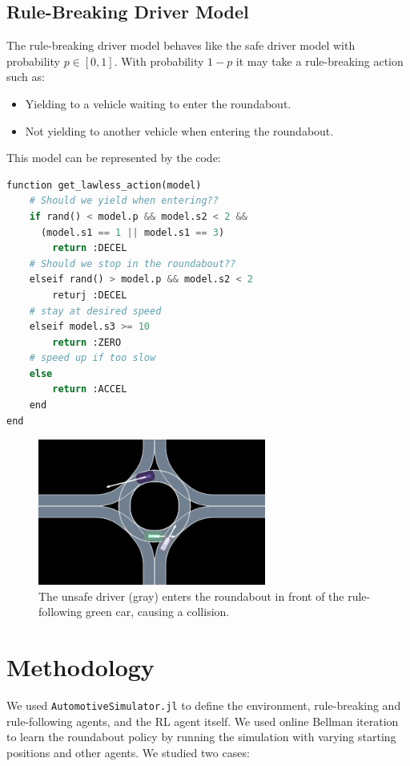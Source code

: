 \documentclass[conference]{IEEEtran}
\begin{document}
\subsection*{Rule-Breaking Driver Model}
The rule-breaking driver model behaves like the safe driver model with probability $p \in [0,1]$. With probability $1-p$ it may take a rule-breaking action such as:
\begin{itemize}
	\item Yielding to a vehicle waiting to enter the roundabout.
	\item Not yielding to another vehicle when entering the roundabout.
\end{itemize}
This model can be represented by the code:
\begin{lstlisting}[language=python]
function get_lawless_action(model)
    # Should we yield when entering??
    if rand() < model.p && model.s2 < 2 &&
      (model.s1 == 1 || model.s1 == 3)
        return :DECEL
    # Should we stop in the roundabout??
    elseif rand() > model.p && model.s2 < 2
        returj :DECEL
    # stay at desired speed
    elseif model.s3 >= 10
        return :ZERO
    # speed up if too slow
    else
        return :ACCEL
    end
end
\end{lstlisting}
\begin{figure}[h!]
	\centering
\includegraphics[width=0.7\linewidth]{figures/unsafe.png}
\caption{The unsafe driver (gray) enters the roundabout in front of the rule-following green car, causing a collision.}
\label{fig:unsafe}
\end{figure}

\section{Methodology}
We used \verb|AutomotiveSimulator.jl| \cite{simulator.jl} to define the environment, rule-breaking and rule-following agents, and the RL agent itself.
We used online Bellman iteration \cite{kochenderfer2022algorithms} to learn the roundabout policy by running the simulation with varying starting positions and other agents.
We studied two cases:
\end{document}
